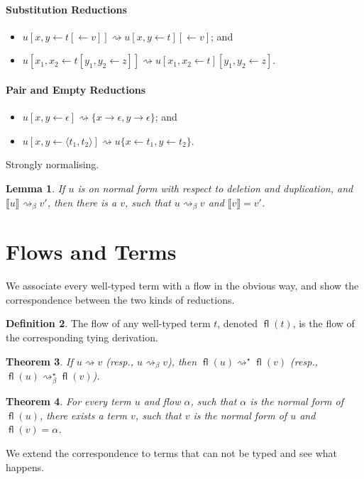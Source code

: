 \documentclass[11pt,a4paper]{article}
\theoremstyle{definition}
\newtheorem{definition}{Definition}
\theoremstyle{plain}
\newtheorem{lemma}[definition]{Lemma}
\newtheorem{theorem}[definition]{Theorem}
\theoremstyle{remark}
\begin{document}
\paragraph{Substitution Reductions}

\begin{itemize}
	\item $u[x,y\leftarrow t[\leftarrow v]]\rightsquigarrow u[x,y\leftarrow t][\leftarrow v]$; and
	\item $u[x_1,x_2\leftarrow t[y_1,y_2\leftarrow z]]\rightsquigarrow u[x_1,x_2\leftarrow t][y_1,y_2\leftarrow z]$.
\end{itemize}

\paragraph{Pair and Empty Reductions}

\begin{itemize}
	\item $u[x,y\leftarrow\epsilon]\rightsquigarrow\{x\rightarrow\epsilon,y\rightarrow\epsilon\}$; and
	\item $u[x,y\leftarrow\langle t_1,t_2\rangle]\rightsquigarrow u\{x\leftarrow t_1,y\leftarrow t_2\}$.
\end{itemize}

Strongly normalising.

\begin{lemma}
	If $u$ is on normal form with respect to deletion and duplication, and $\llbracket u\rrbracket\rightsquigarrow_\beta v'$, then there is a $v$, such that $u\rightsquigarrow_\beta v$ and $\llbracket v\rrbracket=v'$.
\end{lemma}


\section{Flows and Terms}

We associate every well-typed term with a flow in the obvious way, and show the correspondence between the two kinds of reductions.

\newcommand{\fl}{{\mathop{\mathsf{fl}}}}

\begin{definition}
	The flow of any well-typed term $t$, denoted $\fl(t)$, is the flow of the corresponding tying derivation.
\end{definition}

\begin{theorem}
	If $u\rightsquigarrow v$ (resp., $u\rightsquigarrow_\beta v$), then $\fl(u)\rightsquigarrow^\star\fl(v)$ (resp., $\fl(u)\rightsquigarrow^\star_\beta\fl(v)$).
\end{theorem}

\begin{theorem}
	For every term $u$ and flow $\alpha$, such that $\alpha$ is the normal form of $\fl(u)$, there exists a term $v$, such that $v$ is the normal form of $u$ and $\fl(v)=\alpha$.
\end{theorem}

We extend the correspondence to terms that can not be typed and see what happens.
\end{document}
